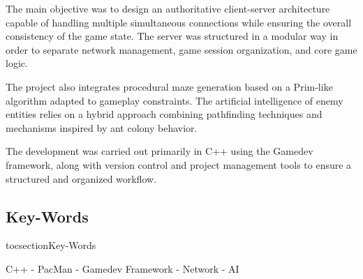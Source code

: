 \documentclass[a4paper, 11pt]{article}
\begin{document}
\begin{center}
\begin{justify}
The main objective was to design an authoritative client-server architecture capable of handling multiple simultaneous connections while ensuring the overall consistency of the game state. The server was structured in a modular way in order to separate network management, game session organization, and core game logic.

The project also integrates procedural maze generation based on a Prim-like algorithm adapted to gameplay constraints. The artificial intelligence of enemy entities relies on a hybrid approach combining pathfinding techniques and mechanisms inspired by ant colony behavior.

The development was carried out primarily in C++ using the Gamedev framework, along with version control and project management tools to ensure a structured and organized workflow.
    \end{justify}
    \vspace*{\fill} %

    \subsection*{Key-Words}
    \addcontentsline
    {toc}{section}{Key-Words}
    \begin{center}
    C++ - PacMan - Gamedev Framework - Network - AI
    \end{center}
    \vspace*{\fill} %
    
    
\end{center}
\end{document}
